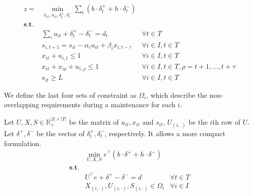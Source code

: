 \documentclass[
  a4paper,
,tablecaptionabove
]{scrartcl}
\numberwithin{equation}{section}
\begin{document}
\begin{equation}\label{eq_primal}
  \begin{aligned}
    z =           & \min_{x_{it}, u_{it}, \delta_t^+, \delta_t^-} \sum_t (b\cdot  \delta_t^+ + h \cdot \delta_t^-)                                                       \\
    \mathbf{s.t.} &                                                                                                                                                      \\
                  & \sum_i u_{it} + \delta_t^+ - \delta_t^- = d_t                                                  & \forall t \in T                                     \\
                  & s_{i, t+1} =  s_{i t}  - \alpha_i  u_{it} + \beta_i  x_{i, t- \tau}                            & \forall i \in I, t \in T                            \\
                  & x_{it} +  u_{i, t} \le 1                                                                       & \forall i \in I, t \in T                            \\
                  & x_{it} + x_{i\rho} + u_{i, \rho} \le 1                                                         & \forall i \in I,  t\in T, \rho = t + 1, ..., t+\tau \\
                  & s_{i t} \ge L                                                                                  & \forall i \in I, t \in T
  \end{aligned}
\end{equation}

We define the last four sets of constraint as \(\Omega_i\), which
describe the non-overlapping requirements during a maintenance for each
\(i\).

Let \(U, X, S \in \mathbb R^{|I|\times |T|}_+\) be the matrix of \(u_{it}, x_{it}\) and \(s_{it}\), \(U_{(i,.)}\) be the \(i\)th row of
\(U\). Let \(\delta^+, \delta^-\) be the vector of \(\delta_t^+, \delta_t^-\), respectively. It allows a more compact
formulation.
\begin{equation}\label{eq_pr_compact}
  \begin{aligned}
                  & \min_{U, X, S}  e^\top (b\cdot  \delta^+ + h \cdot \delta^-)                   \\
    \mathbf{s.t.} &                                                                                \\
                  & U^\top e + \delta^+ - \delta^- = d                           & \forall t \in T \\
                  & X_{(i,\cdot)}, U_{(i,\cdot)}, S_{(i,\cdot)} \in \Omega_i     & \forall i \in I
  \end{aligned}
\end{equation}
\end{document}
